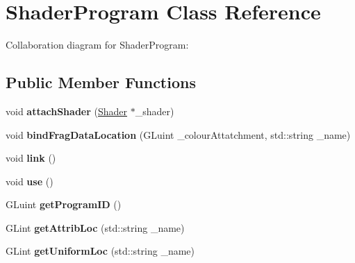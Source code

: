 \hypertarget{class_shader_program}{\section{Shader\-Program Class Reference}
\label{class_shader_program}
}


Collaboration diagram for Shader\-Program\-:
\subsection*{Public Member Functions}
\begin{DoxyCompactItemize}
\item 
\hypertarget{class_shader_program_a9dc8fd5b84bdd2b291152b0885535a98}{void {\bfseries attach\-Shader} (\hyperlink{class_shader}{Shader} $\ast$\-\_\-shader)}\label{class_shader_program_a9dc8fd5b84bdd2b291152b0885535a98}

\item 
\hypertarget{class_shader_program_a85af8430367b97badd970c7d45ff2a62}{void {\bfseries bind\-Frag\-Data\-Location} (G\-Luint \-\_\-colour\-Attatchment, std\-::string \-\_\-name)}\label{class_shader_program_a85af8430367b97badd970c7d45ff2a62}

\item 
\hypertarget{class_shader_program_ade9890eb840126bd3f9b9db42389253c}{void {\bfseries link} ()}\label{class_shader_program_ade9890eb840126bd3f9b9db42389253c}

\item 
\hypertarget{class_shader_program_a285c27da064068522f4900a8e8075f68}{void {\bfseries use} ()}\label{class_shader_program_a285c27da064068522f4900a8e8075f68}

\item 
\hypertarget{class_shader_program_a4bc838439dd995dfd7aafd337fa28995}{G\-Luint {\bfseries get\-Program\-I\-D} ()}\label{class_shader_program_a4bc838439dd995dfd7aafd337fa28995}

\item 
\hypertarget{class_shader_program_a244dbb8783ea4a8030841a0c8e646b0f}{G\-Lint {\bfseries get\-Attrib\-Loc} (std\-::string \-\_\-name)}\label{class_shader_program_a244dbb8783ea4a8030841a0c8e646b0f}

\item 
\hypertarget{class_shader_program_abfed9a7c494ed3c991d017e788dc0883}{G\-Lint {\bfseries get\-Uniform\-Loc} (std\-::string \-\_\-name)}\label{class_shader_program_abfed9a7c494ed3c991d017e788dc0883}

\end{DoxyCompactItemize}

